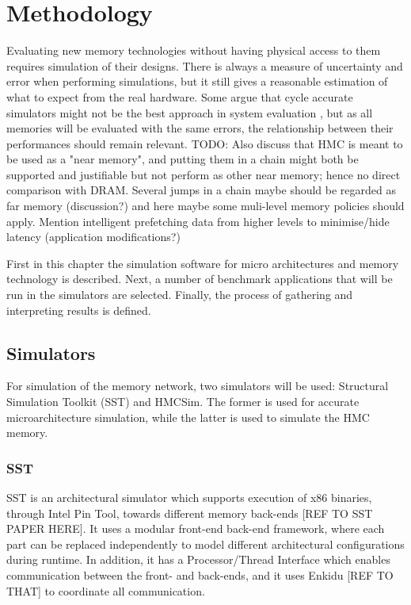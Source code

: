 \chapter{Methodology}
Evaluating new memory technologies without having physical access to them requires simulation of their designs. There is always a measure of uncertainty and error when performing simulations, but it still gives a reasonable estimation of what to expect from the real hardware. Some argue that cycle accurate simulators might not be the best approach in system evaluation \cite{weaver2008cycle}, but as all memories will be evaluated with the same errors, the relationship between their performances should remain relevant. 
TODO: Also discuss that HMC is meant to be used as a "near memory", and putting them in a chain might both be supported and justifiable but not perform as other near memory; hence no direct comparison with DRAM. Several jumps in a chain maybe should be regarded as far memory (discussion?) and here maybe some muli-level memory policies should apply. Mention intelligent prefetching data from higher levels to minimise/hide latency (application modifications?)

First in this chapter the simulation software for micro architectures and memory technology is described. Next, a number of benchmark applications that will be run in the simulators are selected. Finally, the process of gathering and interpreting results is defined.


\section{Simulators}
For simulation of the memory network, two simulators will be used: Structural Simulation Toolkit (SST) and HMCSim. The former is used for accurate microarchitecture simulation, while the latter is used to simulate the HMC memory. 
\subsection{SST}
SST is an architectural simulator which supports execution of x86 binaries, through Intel Pin Tool, towards different memory back-ends [REF TO SST PAPER HERE]. It uses a modular front-end back-end framework, where each part can be replaced independently to model different architectural configurations during runtime. In addition, it has a Processor/Thread Interface which enables communication between the front- and back-ends, and it uses Enkidu [REF TO THAT] to coordinate all communication. 

